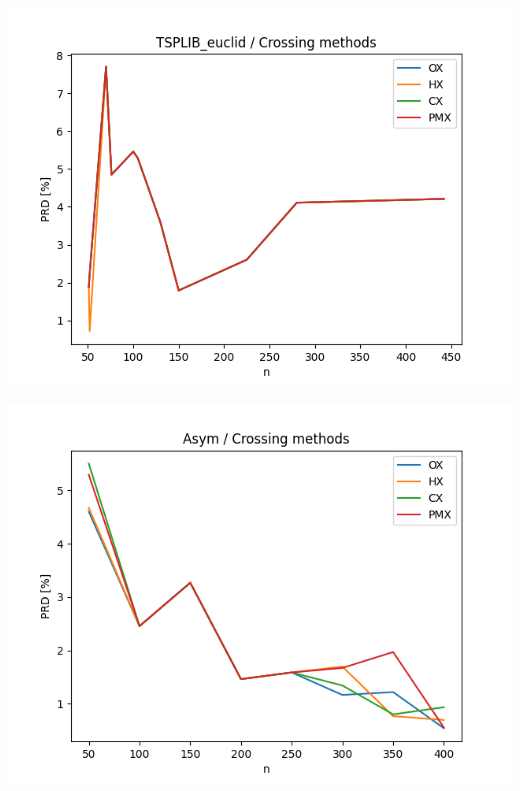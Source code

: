 \documentclass{article}
\begin{document}
\begin{center}
\includegraphics[width=\textwidth, 
                   height = 0.4\textheight, 
                   keepaspectratio]
                  {plots/tsplib_euclid_5_crossing} 
\end{center}

\begin{center}
\includegraphics[width=\textwidth, 
                   height = 0.4\textheight, 
                   keepaspectratio]
                  {plots/asym_5_crossing} 
\end{center}
\end{document}
